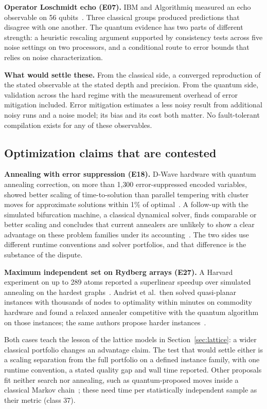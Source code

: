 \textbf{Operator Loschmidt echo (E07).} IBM and Algorithmiq measured an echo observable on 56 qubits~\cite{barron2026,ibmalgo2026}. Three classical groups produced predictions that disagree with one another. The quantum evidence has two parts of different strength: a heuristic rescaling argument supported by consistency tests across five noise settings on two processors, and a conditional route to error bounds that relies on noise characterization.

\textbf{What would settle these.} From the classical side, a converged reproduction of the stated observable at the stated depth and precision. From the quantum side, validation across the hard regime with the measurement overhead of error mitigation included. Error mitigation estimates a less noisy result from additional noisy runs and a noise model; its bias and its cost both matter. No fault-tolerant compilation exists for any of these observables.

\subsection{Optimization claims that are contested}
\textbf{Annealing with error suppression (E18).} D-Wave hardware with quantum annealing correction, on more than 1{,}300 error-suppressed encoded variables, showed better scaling of time-to-solution than parallel tempering with cluster moves for approximate solutions within 1\% of optimal~\cite{munoz2025,dwave_qac}. A follow-up with the simulated bifurcation machine, a classical dynamical solver, finds comparable or better scaling and concludes that current annealers are unlikely to show a clear advantage on these problem families under its accounting~\cite{pawlowski2026}. The two sides use different runtime conventions and solver portfolios, and that difference is the substance of the dispute.

\textbf{Maximum independent set on Rydberg arrays (E27).} A Harvard experiment on up to 289 atoms reported a superlinear speedup over simulated annealing on the hardest graphs~\cite{ebadi2022}. Andrist et al.\ then solved quasi-planar instances with thousands of nodes to optimality within minutes on commodity hardware and found a relaxed annealer competitive with the quantum algorithm on those instances; the same authors propose harder instances~\cite{andrist2023}.

Both cases teach the lesson of the lattice models in Section~\ref{sec:lattice}: a wider classical portfolio changes an advantage claim. The test that would settle either is a scaling separation from the full portfolio on a defined instance family, with one runtime convention, a stated quality gap and wall time reported. Other proposals fit neither search nor annealing, such as quantum-proposed moves inside a classical Markov chain~\cite{layden2023,orfi2024,marshall2026,hsieh2026}; these need time per statistically independent sample as their metric (class 37).

